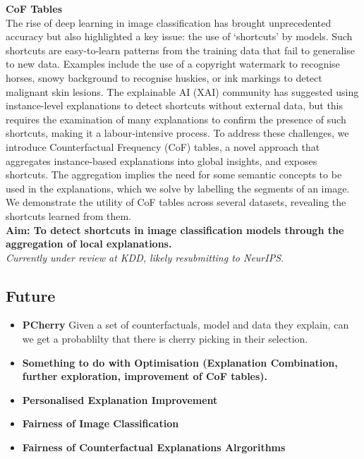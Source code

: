 \noindent
\textbf{CoF Tables}\\
The rise of deep learning in image classification has brought unprecedented accuracy but also highlighted a key 
issue: the use of `shortcuts' by models. Such shortcuts are easy-to-learn patterns from the training data that 
fail to generalise to new data. Examples include the use of a copyright watermark to recognise horses, snowy 
background to recognise huskies, or ink markings to detect malignant skin lesions. The explainable AI (XAI) 
community has suggested using instance-level explanations to detect shortcuts without external data, 
but this requires the examination of many explanations to confirm the presence of such shortcuts, making it a 
labour-intensive process. To address these challenges, we introduce Counterfactual Frequency (CoF) tables, 
a novel approach that aggregates instance-based explanations into global insights, and exposes shortcuts. 
The aggregation implies the need for some semantic concepts to be used in the explanations, which we solve by 
labelling the segments of an image. We demonstrate the utility of CoF tables across several datasets, revealing 
the shortcuts learned from them.\\
\textbf{Aim: To detect shortcuts in image classification models through the aggregation of local explanations.}\\
\textit{Currently under review at KDD, likely resubmitting to NeurIPS.}

\subsection{Future}


\begin{itemize}
    \item \textbf{PCherry}
    Given a set of counterfactuals, model and data they explain, can we get a probablilty that there is cherry picking in their selection.
    \item \textbf{Something to do with Optimisation (Explanation Combination, further exploration, improvement of CoF tables).}
    \item \textbf{Personalised Explanation Improvement}
    \item \textbf{Fairness of Image Classification}
    \item \textbf{Fairness of Counterfactual Explanations Alrgorithms}
\end{itemize}